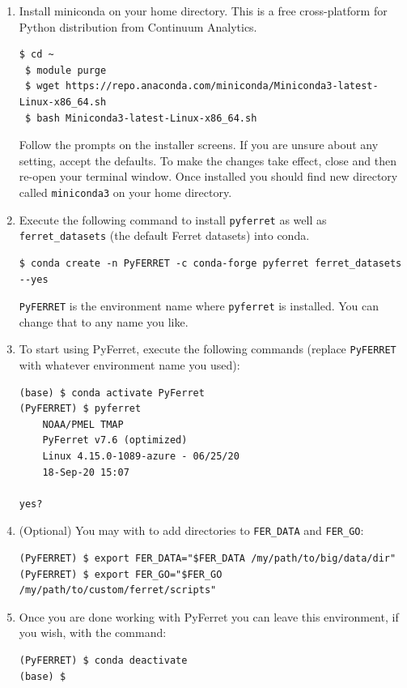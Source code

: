 \documentclass[a4paper]{article}
\def\noin{\noindent }
\begin{document}
\begin{enumerate}
\item Install miniconda on your home directory. This is a free cross-platform for Python distribution from Continuum Analytics. 
\begin{lstlisting}[style=DOS]
 $ cd ~
 $ module purge
 $ wget https://repo.anaconda.com/miniconda/Miniconda3-latest-Linux-x86_64.sh
 $ bash Miniconda3-latest-Linux-x86_64.sh
\end{lstlisting}
\noin Follow the prompts on the installer screens. If you are unsure about any setting, accept the defaults. To make the changes take effect, close and then re-open your terminal window. Once installed you should find new directory called \verb|miniconda3| on your home directory.

\item Execute the following command to install \verb|pyferret| as well as \verb|ferret_datasets| (the default Ferret datasets) into conda.
\begin{lstlisting}[style=DOS]
 $ conda create -n PyFERRET -c conda-forge pyferret ferret_datasets --yes
\end{lstlisting}
\noin \verb|PyFERRET| is the environment name where \verb|pyferret| is installed. You can change that to any name you like.

\item To start using PyFerret, execute the following commands (replace \verb|PyFERRET| with whatever environment name you used):
\begin{lstlisting}[style=DOS]
(base) $ conda activate PyFerret
(PyFERRET) $ pyferret
  	NOAA/PMEL TMAP
 	PyFerret v7.6 (optimized)
 	Linux 4.15.0-1089-azure - 06/25/20
 	18-Sep-20 15:07

yes?
\end{lstlisting}

\item (Optional) You may with to add directories to \verb|FER_DATA| and \verb|FER_GO|:
\begin{lstlisting}[style=DOS]
(PyFERRET) $ export FER_DATA="$FER_DATA /my/path/to/big/data/dir"
(PyFERRET) $ export FER_GO="$FER_GO /my/path/to/custom/ferret/scripts"
\end{lstlisting}

\item Once you are done working with PyFerret you can leave this environment, if you wish, with the command:
\begin{lstlisting}[style=DOS]
(PyFERRET) $ conda deactivate
(base) $
\end{lstlisting}

\end{enumerate}
\end{document}
